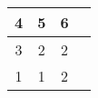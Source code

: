 \begin{tabular}{|c|c|c|c|}
 \hline
 4 & 5 & 6 \\ \hline
  3 & 2 & 2 \\ \hline
  1 & 1 & 2 \\ \hline
\end{tabular}
